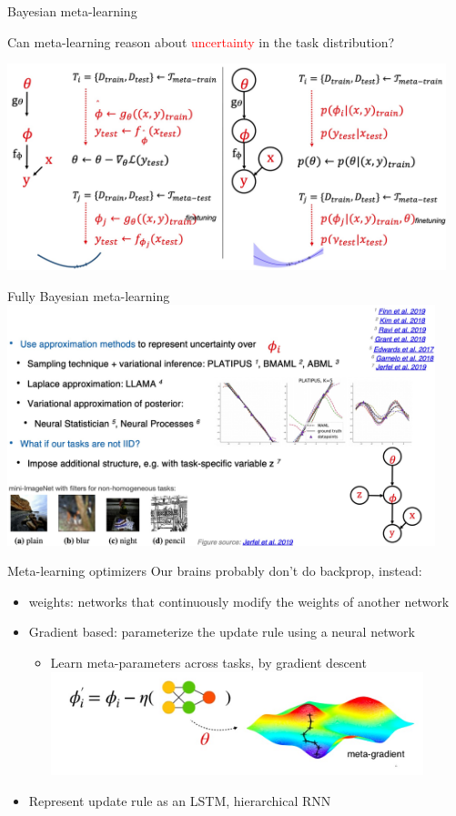 \documentclass[aspectratio=169,t,handout,xcolor={usenames,dvipsnames}]{beamer}
\begin{document}
\begin{frame}{Bayesian meta-learning}
    \centerline{Can meta-learning reason about \textcolor{red}{uncertainty} in the task distribution?}
    \centering\includegraphics[height=6cm]{image/Jietu20220329-010856.jpg}
\end{frame}
\begin{frame}{Fully Bayesian meta-learning}
    \centering\includegraphics[height=7cm]{image/Jietu20220329-011307.jpg}
\end{frame}
\begin{frame}{Meta-learning optimizers}
    Our brains probably don’t do backprop, instead:
    \begin{itemize}
        \item weights: networks that continuously modify the weights of another network
        \item Gradient based: parameterize the update rule using a neural network
        \begin{itemize}
            \item Learn meta-parameters across tasks, by gradient descent
            \centering\includegraphics[height=3cm]{image/Jietu20220329-011721.jpg}
        \end{itemize}
        \item Represent update rule as an LSTM, hierarchical RNN 
    \end{itemize}
\end{frame}
\end{document}
